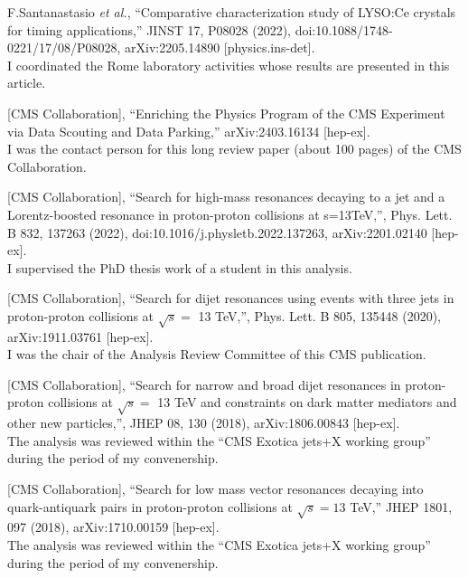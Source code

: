 \documentclass[10pt, a4paper]{article}
\begin{document}


\begin{thebibliography}{599}

F.Santanastasio \textit{et al.},
``Comparative characterization study of LYSO:Ce crystals for timing applications,''
JINST 17, P08028 (2022), doi:10.1088/1748-0221/17/08/P08028,
arXiv:2205.14890 [physics.ins-det].\\
I coordinated the Rome laboratory activities whose results are presented in this article.
  
[CMS Collaboration],
``Enriching the Physics Program of the CMS Experiment via Data Scouting and Data Parking,''
arXiv:2403.16134 [hep-ex].\\
I was the contact person for this long review paper (about 100 pages)
of the CMS Collaboration.
  
[CMS Collaboration],
``Search for high-mass resonances decaying to a jet and a
Lorentz-boosted resonance in proton-proton collisions at s=13TeV,'',
Phys. Lett. B 832, 137263 (2022),
doi:10.1016/j.physletb.2022.137263, arXiv:2201.02140 [hep-ex].\\
I supervised the PhD thesis work of a student in this analysis.

[CMS Collaboration],
``Search for dijet resonances using events with three jets in
proton-proton collisions at $\sqrt{s} =$ 13 TeV,'', Phys. Lett. B
805, 135448 (2020), arXiv:1911.03761 [hep-ex]. \\
I was the chair of the Analysis Review Committee of this CMS publication.

  [CMS Collaboration],
  ``Search for narrow and broad dijet resonances in proton-proton
  collisions at $\sqrt{s}=$ 13 TeV and constraints on dark matter
  mediators and other new particles,'', JHEP 08, 130 (2018), arXiv:1806.00843 [hep-ex]. \\
The analysis was reviewed within the ``CMS Exotica jets+X working
group'' during the period of my convenership.

  [CMS Collaboration],
  ``Search for low mass vector resonances decaying into quark-antiquark pairs in proton-proton collisions at $ \sqrt{s}=13 $ TeV,''
  JHEP 1801, 097 (2018), arXiv:1710.00159 [hep-ex].\\
The analysis was reviewed within the ``CMS Exotica jets+X working
group'' during the period of my convenership.


\end{thebibliography}
\end{document}
